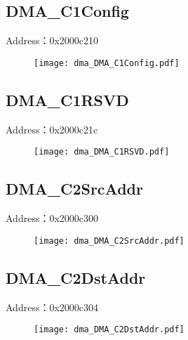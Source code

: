 \subsection{DMA\_C1Config}
\label{dma-DMA-C1Config}
Address：0x2000c210
 \begin{figure}[H]
\texttt{[image: dma\_DMA\_C1Config.pdf]}
\end{figure}

\subsection{DMA\_C1RSVD}
\label{dma-DMA-C1RSVD}
Address：0x2000c21c
 \begin{figure}[H]
\texttt{[image: dma\_DMA\_C1RSVD.pdf]}
\end{figure}

\subsection{DMA\_C2SrcAddr}
\label{dma-DMA-C2SrcAddr}
Address：0x2000c300
 \begin{figure}[H]
\texttt{[image: dma\_DMA\_C2SrcAddr.pdf]}
\end{figure}

\subsection{DMA\_C2DstAddr}
\label{dma-DMA-C2DstAddr}
Address：0x2000c304
 \begin{figure}[H]
\texttt{[image: dma\_DMA\_C2DstAddr.pdf]}
\end{figure}

